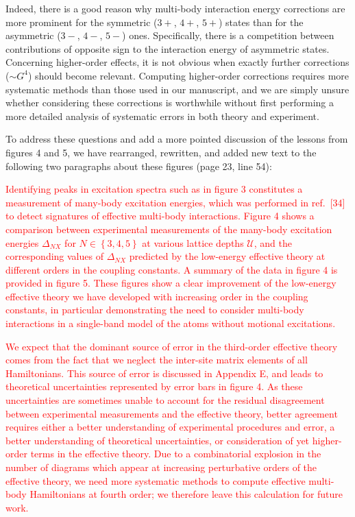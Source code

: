 \documentclass[preprint,showkeys,nofootinbib]{revtex4-1}
\renewcommand{\set}[1]{\left\{#1\right\}} %
\newcommand{\U}{\mathcal{U}}
\newcommand{\1}{\mathds{1}}
\newcommand{\red}[1]{\textcolor{red}{#1}}
\begin{document}
\begin{enumerate}
  Indeed, there is a good reason why multi-body interaction energy
  corrections are more prominent for the symmetric ($3+$, $4+$, $5+$)
  states than for the asymmetric ($3-$, $4-$, $5-$) ones.
  Specifically, there is a competition between contributions of
  opposite sign to the interaction energy of asymmetric states.
  Concerning higher-order effects, it is not obvious when exactly
  further corrections ($\sim G^4$) should become relevant.  Computing
  higher-order corrections requires more systematic methods than those
  used in our manuscript, and we are simply unsure whether considering
  these corrections is worthwhile without first performing a more
  detailed analysis of systematic errors in both theory and
  experiment.

  To address these questions and add a more pointed discussion of the
  lessons from figures 4 and 5, we have rearranged, rewritten, and
  added new text to the following two paragraphs about these figures
  (page 23, line 54):

  \red{Identifying peaks in excitation spectra such as in figure 3
    constitutes a measurement of many-body excitation energies, which
    was performed in ref.~[34] to detect signatures of effective
    multi-body interactions.  Figure 4 shows a comparison between
    experimental measurements of the many-body excitation energies
    $\Delta_{NX}$ for $N\in\set{3,4,5}$ at various lattice depths
    $\U$, and the corresponding values of $\Delta_{NX}$ predicted by
    the low-energy effective theory at different orders in the
    coupling constants.  A summary of the data in figure 4 is provided
    in figure 5.  These figures show a clear improvement of the
    low-energy effective theory we have developed with increasing
    order in the coupling constants, in particular demonstrating the
    need to consider multi-body interactions in a single-band model of
    the atoms without motional excitations.}

  \red{We expect that the dominant source of error in the third-order
    effective theory comes from the fact that we neglect the
    inter-site matrix elements of all Hamiltonians.  This source of
    error is discussed in Appendix E, and leads to theoretical
    uncertainties represented by error bars in figure 4.  As these
    uncertainties are sometimes unable to account for the residual
    disagreement between experimental measurements and the effective
    theory, better agreement requires either a better understanding of
    experimental procedures and error, a better understanding of
    theoretical uncertainties, or consideration of yet higher-order
    terms in the effective theory.  Due to a combinatorial explosion
    in the number of diagrams which appear at increasing perturbative
    orders of the effective theory, we need more systematic methods to
    compute effective multi-body Hamiltonians at fourth order; we
    therefore leave this calculation for future work.}


\end{enumerate}
\end{document}
